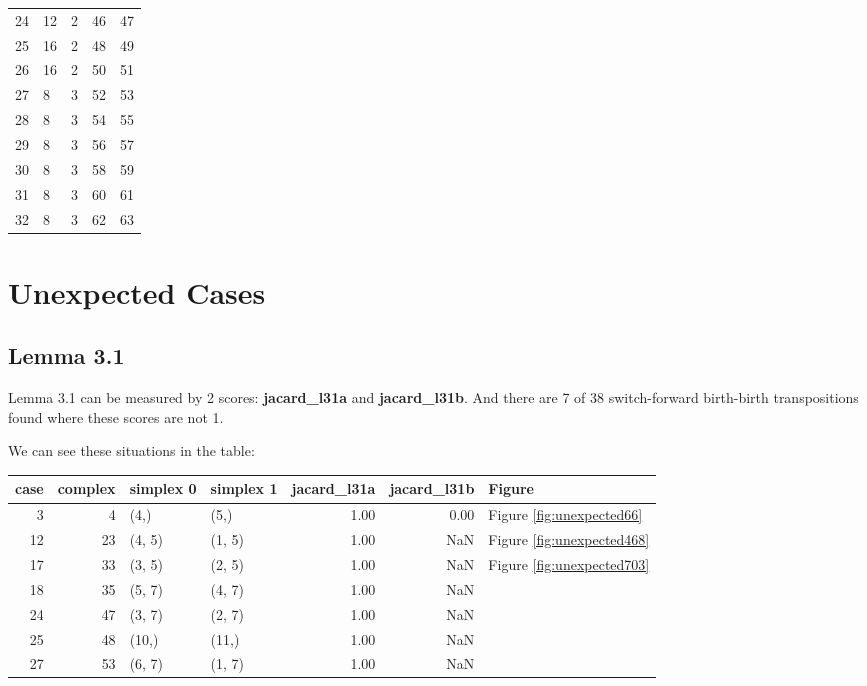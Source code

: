 \documentclass{article}
\begin{document}
\begin{center}
\begin{tabular}{lllrr}
\cline{1-5} \cline{2-5}
24 & 12 & 2 & 46 & 47 \\
\cline{1-5} \cline{2-5}
25 & 16 & 2 & 48 & 49 \\
\cline{1-5} \cline{2-5}
26 & 16 & 2 & 50 & 51 \\
\cline{1-5} \cline{2-5}
27 & 8 & 3 & 52 & 53 \\
\cline{1-5} \cline{2-5}
28 & 8 & 3 & 54 & 55 \\
\cline{1-5} \cline{2-5}
29 & 8 & 3 & 56 & 57 \\
\cline{1-5} \cline{2-5}
30 & 8 & 3 & 58 & 59 \\
\cline{1-5} \cline{2-5}
31 & 8 & 3 & 60 & 61 \\
\cline{1-5} \cline{2-5}
32 & 8 & 3 & 62 & 63 \\
\cline{1-5} \cline{2-5}
\bottomrule
\end{tabular}

\end{center}


\section{Unexpected Cases}
\subsection{Lemma 3.1}

\par Lemma 3.1 can be measured by 2 scores: \textbf{jacard\_l31a} and \textbf{jacard\_l31b}.
And there are 7 of 38 switch-forward birth-birth transpositions found where these scores are not 1.
\par We can see these situations in the table:
\begin{center}\begin{tabular}{rrllrrl}
\toprule
case & complex & simplex 0 & simplex 1 & jacard\_l31a & jacard\_l31b & Figure \\
\midrule
3 & 4 & (4,) & (5,) & 1.00 & 0.00 & Figure \ref{fig:unexpected66} \\
12 & 23 & (4, 5) & (1, 5) & 1.00 & NaN & Figure \ref{fig:unexpected468} \\
17 & 33 & (3, 5) & (2, 5) & 1.00 & NaN & Figure \ref{fig:unexpected703} \\
18 & 35 & (5, 7) & (4, 7) & 1.00 & NaN &  \\
24 & 47 & (3, 7) & (2, 7) & 1.00 & NaN &  \\
25 & 48 & (10,) & (11,) & 1.00 & NaN &  \\
27 & 53 & (6, 7) & (1, 7) & 1.00 & NaN &  \\
\bottomrule
\end{tabular}
\end{center}
\end{document}
